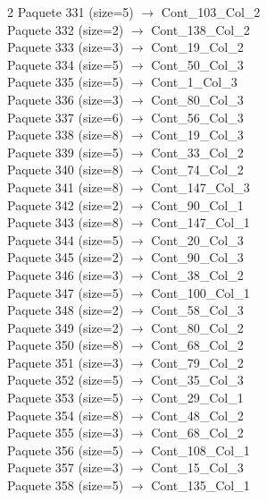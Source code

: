 \begin{multicols}{2}
Paquete 331 (size=5) $\rightarrow$ Cont\_103\_Col\_2\\
Paquete 332 (size=2) $\rightarrow$ Cont\_138\_Col\_2\\
Paquete 333 (size=3) $\rightarrow$ Cont\_19\_Col\_2\\
Paquete 334 (size=5) $\rightarrow$ Cont\_50\_Col\_3\\
Paquete 335 (size=5) $\rightarrow$ Cont\_1\_Col\_3\\
Paquete 336 (size=3) $\rightarrow$ Cont\_80\_Col\_3\\
Paquete 337 (size=6) $\rightarrow$ Cont\_56\_Col\_3\\
Paquete 338 (size=8) $\rightarrow$ Cont\_19\_Col\_3\\
Paquete 339 (size=5) $\rightarrow$ Cont\_33\_Col\_2\\
Paquete 340 (size=8) $\rightarrow$ Cont\_74\_Col\_2\\
Paquete 341 (size=8) $\rightarrow$ Cont\_147\_Col\_3\\
Paquete 342 (size=2) $\rightarrow$ Cont\_90\_Col\_1\\
Paquete 343 (size=8) $\rightarrow$ Cont\_147\_Col\_1\\
Paquete 344 (size=5) $\rightarrow$ Cont\_20\_Col\_3\\
Paquete 345 (size=2) $\rightarrow$ Cont\_90\_Col\_3\\
Paquete 346 (size=3) $\rightarrow$ Cont\_38\_Col\_2\\
Paquete 347 (size=5) $\rightarrow$ Cont\_100\_Col\_1\\
Paquete 348 (size=2) $\rightarrow$ Cont\_58\_Col\_3\\
Paquete 349 (size=2) $\rightarrow$ Cont\_80\_Col\_2\\
Paquete 350 (size=8) $\rightarrow$ Cont\_68\_Col\_2\\
Paquete 351 (size=3) $\rightarrow$ Cont\_79\_Col\_2\\
Paquete 352 (size=5) $\rightarrow$ Cont\_35\_Col\_3\\
Paquete 353 (size=5) $\rightarrow$ Cont\_29\_Col\_1\\
Paquete 354 (size=8) $\rightarrow$ Cont\_48\_Col\_2\\
Paquete 355 (size=3) $\rightarrow$ Cont\_68\_Col\_2\\
Paquete 356 (size=5) $\rightarrow$ Cont\_108\_Col\_1\\
Paquete 357 (size=3) $\rightarrow$ Cont\_15\_Col\_3\\
Paquete 358 (size=5) $\rightarrow$ Cont\_135\_Col\_1\\

\end{multicols}
